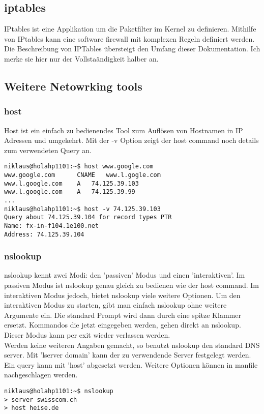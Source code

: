 \documentclass[10pt,paper=a4,final]{scrartcl}
\begin{document}
\subsection{iptables}
IPtables ist eine Applikation um die Paketfilter im Kernel zu definieren. Mithilfe von IPtables kann eine software firewall mit komplexen Regeln definiert werden. Die Beschreibung von IPTables \"ubersteigt den Umfang dieser Dokumentation. Ich merke sie hier nur der Vollsta\"andigkeit halber an.
\subsection{Weitere Netowrking tools}
\subsubsection{host}
Host ist ein einfach zu bedienendes Tool zum Aufl\"osen von Hostnamen in IP Adressen und umgekehrt. Mit der -v Option zeigt der host command noch details zum verwendeten Query an.
\begin{lstlisting}[frame=single]
niklaus@holahp1101:~$ host www.google.com
www.google.com		CNAME	www.l.gogle.com
www.l.google.com	A	74.125.39.103
www.l.google.com	A	74.125.39.99
...
niklaus@holahp1101:~$ host -v 74.125.39.103
Query about 74.125.39.104 for record types PTR
Name: fx-in-f104.1e100.net
Address: 74.125.39.104
\end{lstlisting}
\subsubsection{nslookup}
nslookup kennt zwei Modi: den 'passiven' Modus und einen 'interaktiven'. Im passiven Modus ist nslookup genau gleich zu bedienen wie der host command. Im interaktiven Modus jedoch, bietet nslookup viele weitere Optionen. Um den interaktiven Modus zu starten, gibt man einfach nslookup ohne weitere Argumente ein. Die standard Prompt wird dann durch eine spitze Klammer ersetzt. Kommandos die jetzt eingegeben werden, gehen direkt an nslookup. Dieser Modus kann per exit wieder verlassen werden.\\
Werden keine weiteren Angaben gemacht, so benutzt nslookup den standard DNS server. Mit 'lserver domain' kann der zu verwendende Server festgelegt werden. Ein query kann mit 'host' abgesetzt werden. Weitere Optionen k\"onnen in manfile nachgeschlagen werden.
\begin{lstlisting}[frame=single]
niklaus@holahp1101:~$ nslookup
> server swisscom.ch
> host heise.de
\end{lstlisting}
\end{document}
